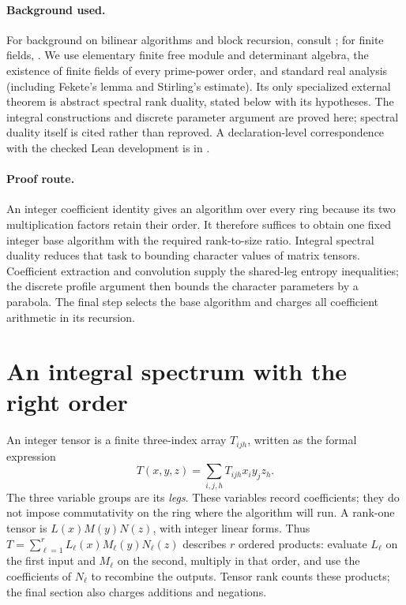 \documentclass[11pt]{article}
\theoremstyle{remark}
\begin{document}
\paragraph{Background used.}
For background on bilinear algorithms and block recursion, consult
\cite[Chapters 14--15]{BCS}; for finite fields, \cite[Chapter 2]{LN}.
We use elementary finite free module and determinant algebra,
the existence of finite fields of every prime-power order, and standard
real analysis (including Fekete's lemma and Stirling's estimate).
Its only specialized external theorem is abstract spectral rank duality,
stated below with its hypotheses. The integral constructions and discrete
parameter argument are proved here; spectral duality itself is cited
rather than reproved. A declaration-level correspondence with the checked
Lean development is in .

\paragraph{Proof route.}
An integer coefficient identity gives an algorithm over every ring
because its two multiplication factors retain their order. It therefore
suffices to obtain one fixed integer base algorithm with the required
rank-to-size ratio. Integral spectral duality reduces that task to
bounding character values of matrix tensors. Coefficient extraction and
convolution supply the shared-leg entropy inequalities; the discrete
profile argument then bounds the character parameters by a parabola.
The final step selects the base algorithm and charges all coefficient
arithmetic in its recursion.

\section{An integral spectrum with the right order}

An integer tensor is a finite three-index array $T_{ijh}$, written
as the formal expression
\[
 T(x,y,z)=\sum_{i,j,h}T_{ijh}x_i y_j z_h.
\]
The three variable groups are its \emph{legs}. These variables record
coefficients; they do not impose commutativity on the ring where the
algorithm will run. A rank-one tensor is $L(x)M(y)N(z)$, with integer
linear forms. Thus $T=\sum_{\ell=1}^rL_\ell(x)M_\ell(y)N_\ell(z)$
describes $r$ ordered products: evaluate $L_\ell$ on the first input
and $M_\ell$ on the second, multiply in that order, and use the
coefficients of $N_\ell$ to recombine the outputs. Tensor rank counts
these products; the final section also charges additions and negations.
\end{document}
